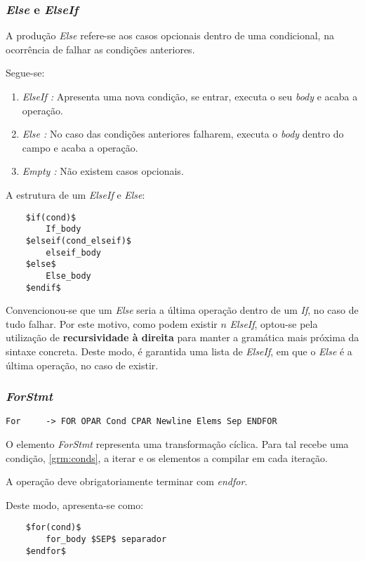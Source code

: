 \documentclass[../relatorio.tex]{subfiles}
\begin{document}
\subsubsection{\textit{Else} e \textit{ElseIf}} \label{grm:else}
A produção \textit{Else} refere-se aos casos opcionais 
dentro de uma condicional, na ocorrência de falhar as
condições anteriores.

Segue-se:
\begin{enumerate}
    \item \textit{ElseIf :} Apresenta uma nova condição, se entrar, executa o seu \textit{body}
                            e acaba a operação.
    \item \textit{Else :} No caso das condições anteriores falharem, executa o \textit{body} dentro do campo
                          e acaba a operação.
    \item \textit{Empty :} Não existem casos opcionais.
\end{enumerate}

A estrutura de um \textit{ElseIf} e \textit{Else}:
\begin{verbatim}    
    $if(cond)$
        If_body
    $elseif(cond_elseif)$
        elseif_body
    $else$
        Else_body
    $endif$
\end{verbatim}

Convencionou-se que um \textit{Else} seria a última operação dentro de um \textit{If}, no 
caso de tudo falhar. 
Por este motivo, como podem existir $n$ \textit{ElseIf}, optou-se pela utilização 
de \textbf{recursividade à direita} para manter a gramática mais próxima da sintaxe concreta. 
Deste modo, é garantida uma lista de \textit{ElseIf}, em que o \textit{Else}
é a última operação, no caso de existir.

\subsubsection{\textit{ForStmt}} \label{grm:forstmt}
\begin{verbatim}
For     -> FOR OPAR Cond CPAR Newline Elems Sep ENDFOR  
\end{verbatim}

O elemento \textit{ForStmt} representa uma transformação cíclica.
Para tal recebe uma condição, \ref{grm:conds}, a iterar 
e os elementos a compilar em cada iteração.

A operação deve obrigatoriamente terminar com \textit{endfor}.

Deste modo, apresenta-se como:
\begin{verbatim}
    $for(cond)$
        for_body $SEP$ separador
    $endfor$
\end{verbatim}
\end{document}
